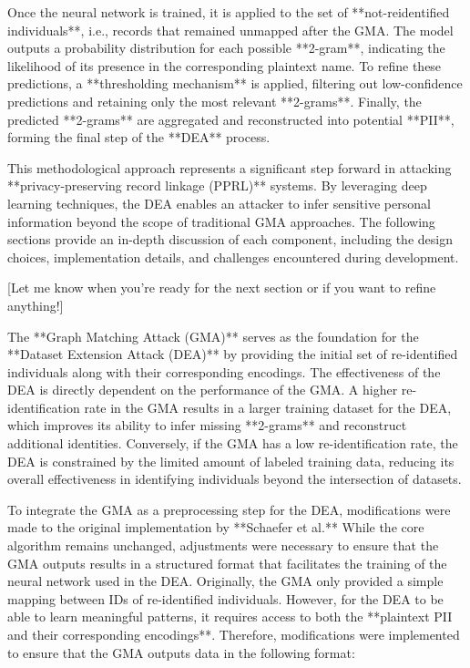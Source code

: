 Once the neural network is trained, it is applied to the set of **not-reidentified individuals**, i.e., records that remained unmapped after the GMA. The model outputs a probability distribution for each possible **2-gram**, indicating the likelihood of its presence in the corresponding plaintext name. To refine these predictions, a **thresholding mechanism** is applied, filtering out low-confidence predictions and retaining only the most relevant **2-grams**. Finally, the predicted **2-grams** are aggregated and reconstructed into potential **PII**, forming the final step of the **DEA** process.

This methodological approach represents a significant step forward in attacking **privacy-preserving record linkage (PPRL)** systems. By leveraging deep learning techniques, the DEA enables an attacker to infer sensitive personal information beyond the scope of traditional GMA approaches. The following sections provide an in-depth discussion of each component, including the design choices, implementation details, and challenges encountered during development.

[Let me know when you're ready for the next section or if you want to refine anything!]

The **Graph Matching Attack (GMA)** serves as the foundation for the **Dataset Extension Attack (DEA)** by providing the initial set of re-identified individuals along with their corresponding encodings. The effectiveness of the DEA is directly dependent on the performance of the GMA. A higher re-identification rate in the GMA results in a larger training dataset for the DEA, which improves its ability to infer missing **2-grams** and reconstruct additional identities. Conversely, if the GMA has a low re-identification rate, the DEA is constrained by the limited amount of labeled training data, reducing its overall effectiveness in identifying individuals beyond the intersection of datasets.

To integrate the GMA as a preprocessing step for the DEA, modifications were made to the original implementation by **Schaefer et al.** While the core algorithm remains unchanged, adjustments were necessary to ensure that the GMA outputs results in a structured format that facilitates the training of the neural network used in the DEA. Originally, the GMA only provided a simple mapping between IDs of re-identified individuals. However, for the DEA to be able to learn meaningful patterns, it requires access to both the **plaintext PII and their corresponding encodings**. Therefore, modifications were implemented to ensure that the GMA outputs data in the following format:


